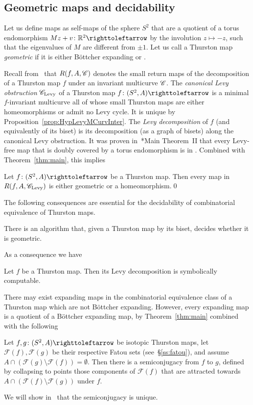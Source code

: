 \documentclass{amsart}
\newcommand\Fatou{{\mathcal F}}
\begin{document}
\subsection{Geometric maps and decidability}
Let us define \emph{\Tor} maps as self-maps of the sphere $S^2$ that
are a quotient of a torus endomorphism $M z+v\colon\R^2\selfmap$ by
the involution $z\mapsto-z$, such that the eigenvalues of $M$ are
different from $\pm 1$. Let us call a Thurston map \emph{geometric} if
it is either B\"ottcher expanding or \Tor.

Recall from~\cite{bartholdi-dudko:bc2} that $R(f,A,{\mathscr C})$ denotes the
small return maps of the decomposition of a Thurston map $f$ under an
invariant multicurve ${\mathscr C}$. The \emph{canonical Levy obstruction}
${\mathscr C}_{\text{Levy}}$ of a Thurston map $f\colon(S^2,A)\selfmap$ is a
minimal $f$-invariant multicurve all of whose small Thurston maps are
either homeomorphisms or admit no Levy cycle. It is unique by
Proposition~\ref{prop:HypLevyMCurvInter}. The \emph{Levy
  decomposition} of $f$ (and equivalently of its biset) is its
decomposition (as a graph of bisets) along the canonical Levy
obstruction. It was proven
in~\cite{selinger-yampolsky:geometrization}*{Main Theorem~II} that
every Levy-free map that is doubly covered by a torus endomorphism is
in \Tor. Combined with Theorem~\ref{thm:main}, this implies
\begin{maincor}
  Let $f\colon(S^2,A)\selfmap$ be a Thurston map. Then every map in
  $R(f,A,{\mathscr C}_{\text{Levy}})$ is either geometric or a homeomorphism.\qed
\end{maincor}

The following consequences are essential for the decidability of
combinatorial equivalence of Thurston maps.
\begin{maincor}[= Algorithms~\ref{algo:istor} and~\ref{algo:isexp}]\label{cor:decidegeom}
  There is an algorithm that, given a Thurston map by its biset,
  decides whether it is geometric.
\end{maincor}

\noindent As a consequence we have
\begin{maincor}[= Algorithm~\ref{algo:levy}]\label{cor:decidelevy}
  Let $f$ be a Thurston map. Then its Levy decomposition is
  symbolically computable.
\end{maincor}

There may exist expanding maps in the combinatorial equivalence class
of a Thurston map which are not B\"ottcher expanding. However, every
expanding map is a quotient of a B\"ottcher expanding map, by
Theorem~\ref{thm:main} combined with the following
\begin{prop}[= Proposition~\ref{prop:semiconjugate}]
  Let $f,g\colon(S^2,A)\selfmap$ be isotopic Thurston maps, let
  $\Fatou(f),\Fatou(g)$ be their respective Fatou sets
  (see~\S\ref{ss:fatou}), and assume
  $A\cap(\Fatou(g)\setminus\Fatou(f))=\emptyset$.  Then there is a
  semiconjugacy from $f$ to $g$, defined by collapsing to
  points those components of $\Fatou(f)$ that are attracted towards
  $A\cap(\Fatou(f)\setminus\Fatou(g))$ under $f$.
\end{prop}
We will show in~\cite{bartholdi-dudko:bc3} that the semiconjugacy is
unique.
\end{document}
